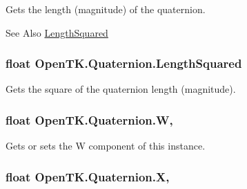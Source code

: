 Gets the length (magnitude) of the quaternion. 

\begin{DoxySeeAlso}{See Also}
\hyperlink{struct_open_t_k_1_1_quaternion_a356340ca64b0873a256f823228bc3c75}{Length\-Squared}


\end{DoxySeeAlso}
\hypertarget{struct_open_t_k_1_1_quaternion_a356340ca64b0873a256f823228bc3c75}{
\subsubsection[{Length\-Squared}]{\setlength{\rightskip}{0pt plus 5cm}float Open\-T\-K.\-Quaternion.\-Length\-Squared\hspace{0.3cm}{\ttfamily [get]}}}\label{struct_open_t_k_1_1_quaternion_a356340ca64b0873a256f823228bc3c75}


Gets the square of the quaternion length (magnitude). 

\hypertarget{struct_open_t_k_1_1_quaternion_a9393e674a6d043b72c26ec8fac95a5c3}{
\subsubsection[{W}]{\setlength{\rightskip}{0pt plus 5cm}float Open\-T\-K.\-Quaternion.\-W\hspace{0.3cm}{\ttfamily [get]}, {\ttfamily [set]}}}\label{struct_open_t_k_1_1_quaternion_a9393e674a6d043b72c26ec8fac95a5c3}


Gets or sets the W component of this instance. 

\hypertarget{struct_open_t_k_1_1_quaternion_af928c6d2c5e59f5d771223b1d9c7018b}{
\subsubsection[{X}]{\setlength{\rightskip}{0pt plus 5cm}float Open\-T\-K.\-Quaternion.\-X\hspace{0.3cm}{\ttfamily [get]}, {\ttfamily [set]}}}\label{struct_open_t_k_1_1_quaternion_af928c6d2c5e59f5d771223b1d9c7018b}


